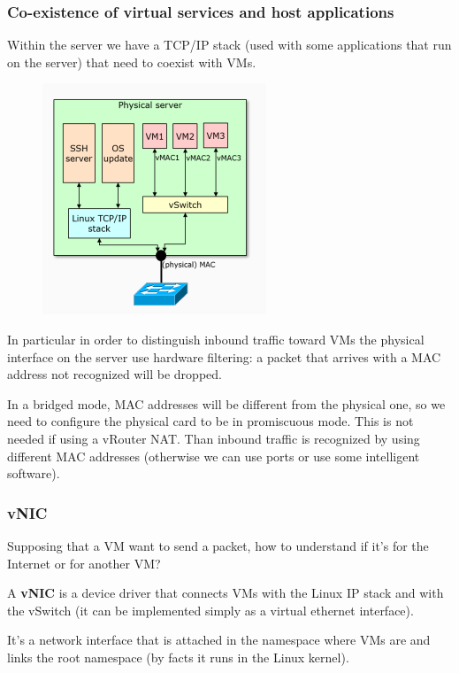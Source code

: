         
    \subsubsection{Co-existence of virtual services and host applications}
        \FloatBarrier
        Within the server we have a TCP/IP stack (used with some applications that run on the server) that need to coexist with VMs.
        \begin{figure}[h!]
            \centering
            \includegraphics[scale=0.55]{images/TCP IP stack.png}
        \end{figure}
        \FloatBarrier
        
        In particular in order to distinguish inbound traffic toward VMs the physical interface on the server use hardware filtering: a packet that arrives with a MAC address not recognized will be dropped.
        
        In a bridged mode, MAC addresses will be different from the physical one, so we need to configure the physical card to be in promiscuous mode. This is not needed if using a vRouter NAT.
        Than inbound traffic is recognized by using different MAC addresses (otherwise we can use ports or use some intelligent software).
        
    
    \subsubsection{vNIC}
        Supposing that a VM want to send a packet, how to understand if it's for the Internet or for another VM?
    
        A \textbf{vNIC} is a device driver that connects VMs with the Linux IP stack and with the vSwitch (it can be implemented simply as a virtual ethernet interface).
        
        It's a network interface that is attached in the namespace where VMs are and links the root namespace (by facts it runs in the Linux kernel). 
        
